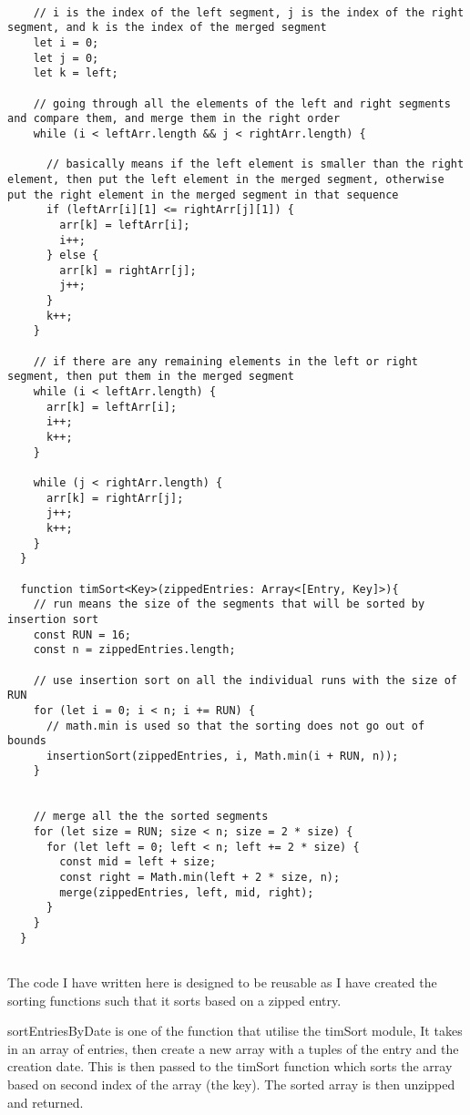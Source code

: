 \begin{verbatim}
  
    // i is the index of the left segment, j is the index of the right segment, and k is the index of the merged segment
    let i = 0;
    let j = 0;
    let k = left;
    
    // going through all the elements of the left and right segments and compare them, and merge them in the right order
    while (i < leftArr.length && j < rightArr.length) {
      
      // basically means if the left element is smaller than the right element, then put the left element in the merged segment, otherwise put the right element in the merged segment in that sequence
      if (leftArr[i][1] <= rightArr[j][1]) {
        arr[k] = leftArr[i];
        i++;
      } else {
        arr[k] = rightArr[j];
        j++;
      }
      k++;
    }
  
    // if there are any remaining elements in the left or right segment, then put them in the merged segment
    while (i < leftArr.length) {
      arr[k] = leftArr[i];
      i++;
      k++;
    }
  
    while (j < rightArr.length) {
      arr[k] = rightArr[j];
      j++;
      k++;
    }
  }
  
  function timSort<Key>(zippedEntries: Array<[Entry, Key]>){
    // run means the size of the segments that will be sorted by insertion sort
    const RUN = 16;
    const n = zippedEntries.length;
  
    // use insertion sort on all the individual runs with the size of RUN
    for (let i = 0; i < n; i += RUN) {
      // math.min is used so that the sorting does not go out of bounds
      insertionSort(zippedEntries, i, Math.min(i + RUN, n));
    }
  
  
    // merge all the the sorted segments
    for (let size = RUN; size < n; size = 2 * size) {
      for (let left = 0; left < n; left += 2 * size) {
        const mid = left + size;
        const right = Math.min(left + 2 * size, n);
        merge(zippedEntries, left, mid, right);
      }
    }
  }
  
\end{verbatim}

The code I have written here is designed to be reusable as I have created the sorting functions such that it sorts based on a zipped entry.

sortEntriesByDate is one of the function that utilise the timSort module, It takes in an array of entries, then create a new array with a tuples of the entry and the creation date. This is then passed to the timSort function which sorts the array based on second index of the array (the key). The sorted array is then unzipped and returned. 

